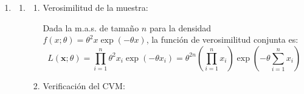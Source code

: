 \begin{enumerate}[label=\color{red}\textbf{\arabic*)}]
\begin{enumerate}[label=\arabic*)]
		            Sustituyendo los datos de la tabla: \[
			            F_{obs}=\dfrac{3.9}{3.6}=1.0833
		            \]
		      \item Determinación de la región de rechazo $(S_1)$:

		            Dado que la hipótesis alternativa postula un valor "mayor que" $(H_1:>)$, se trata de un contraste unilateral derecho. La región de rechazo estará formada por los valores en al cola superior de la distribución: \[
			            S_1=\{(\mathbf{x}_A,\mathbf{x}_B)\mid F>\mathcal{F}_{n_A-1,n_B-1,1-\alpha}\}
		            \]
		            Sustituyendo los grados de libertad: \[
			            S_1=\{(\mathbf{x}_A,\mathbf{x}_B)\mid F>\mathcal{F}_{24,29,1-\alpha}\}
		            \]
		      \item Regla de Decisión:

		            Fijado un nivel de significación $\alpha$, la regla deductiva exacta será:
		            \begin{itemize}[label=\textbullet]
			            \item \textbf{Rechazar} $H_0$ si $1.0833>\mathcal{F}_{24,29,1-\alpha}$
			            \item \textbf{Aceptar} $H_0$ si $1.0833<\mathcal{F}_{24,29,1-\alpha}$
		            \end{itemize}
	      \end{enumerate}
	\item {}
	      \begin{enumerate}[label=\color{red}\textbf{\alph*)}]
		      \item {}
		            \begin{enumerate}[label=\arabic*)]
			            \item Verosimilitud de la muestra:

			                  Dada la m.a.s. de tamaño $n$ para la densidad $f(x;\theta)=\theta^2x \exp \left( -\theta x \right)$, la función de verosimilitud conjunta es: \[
				                  L(\mathbf{x};\theta)=\prod_{i=1}^{n} \theta^2x_i \exp(-\theta x_{i})=\theta^{2n}\left( \prod_{i=1}^{n} x_{i}  \right) \exp \left( -\theta \sum_{i=1}^{n} x_{i} \right)
			                  \]
			            \item Verificación del CVM:


\end{enumerate}
\end{enumerate}
\end{enumerate}
